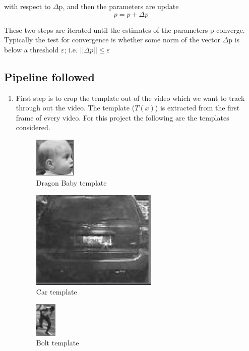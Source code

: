 \documentclass[12pt]{article}
\begin{document}
with respect to $\Delta$p, and then the parameters are update
\begin{equation}
p = p + \Delta p
\end{equation}

These two steps are iterated until the estimates of the parameters p converge. Typically the test for
convergence is whether some norm of the vector $\Delta$p is below a threshold $\varepsilon$; i.e. $||\Delta p|| \leq \varepsilon $ 
\subsection{Pipeline followed}
\begin{enumerate}
\item First step is to crop the template out of the video which we want to track through out the video. The template ($T(x)$) is extracted from the first frame of every video. For this project the following are the templates considered.

\begin{figure}[h]
    \centering
    \includegraphics[width=2cm]{babytemplate}
    \caption{Dragon Baby template}
    \label{fig:Dragon Baby template}
\end{figure}

\begin{figure}[h]
    \centering
    \includegraphics[width=6cm]{cartemplate}
    \caption{Car template}
    \label{fig:Car template}
\end{figure}

\begin{figure}[h]
    \centering
    \includegraphics[width=1cm]{bolttemplate}
    \caption{Bolt template}
    \label{fig: Bolt template}
\end{figure}


\end{enumerate}
\end{document}
